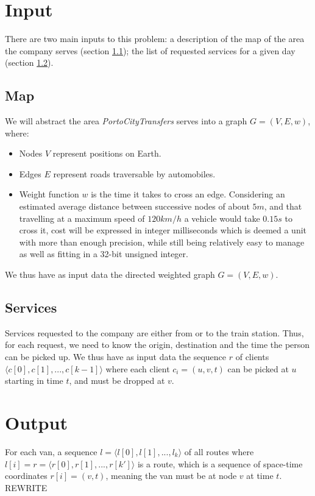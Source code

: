 \documentclass{report}[a4paper]
\theoremstyle{remark}
\begin{document}
\section{Input}
There are two main inputs to this problem: a description of the map of the area the company serves (section \ref{input-map}); the list of requested services for a given day (section \ref{input-services}).
\subsection{Map} \label{input-map}
We will abstract the area \emph{PortoCityTransfers} serves into a graph $G=(V,E, w)$, where:
\begin{itemize}
    \item Nodes $V$ represent positions on Earth.
    \item Edges $E$ represent roads traversable by automobiles.
    \item Weight function $w$ is the time it takes to cross an edge. Considering an estimated average distance between successive nodes of about $5 m$, and that travelling at a maximum speed of $120 km/h$ a vehicle would take $0.15 s$ to cross it, cost will be expressed in integer milliseconds which is deemed a unit with more than enough precision, while still being relatively easy to manage as well as fitting in a 32-bit unsigned integer.
\end{itemize}
We thus have as input data the directed weighted graph $G=(V,E,w)$.
\subsection{Services} \label{input-services}
Services requested to the company are either from or to the train station. Thus, for each request, we need to know the origin, destination and the time the person can be picked up.
We thus have as input data the sequence $r$ of clients $\langle c[0], c[1], ..., c[k-1] \rangle$ where each client $c_i=(u, v, t)$ can be picked at $u$ starting in time $t$, and must be dropped at $v$.
\section{Output}
For each van, a sequence $l=\langle l[0], l[1], ..., l_k \rangle$ of all routes where $l[i]=r=\langle r[0], r[1],..., r[k']\rangle$ is a route, which is a sequence of space-time coordinates $r[i]=(v, t)$, meaning the van must be at node $v$ at time $t$. REWRITE
\end{document}
